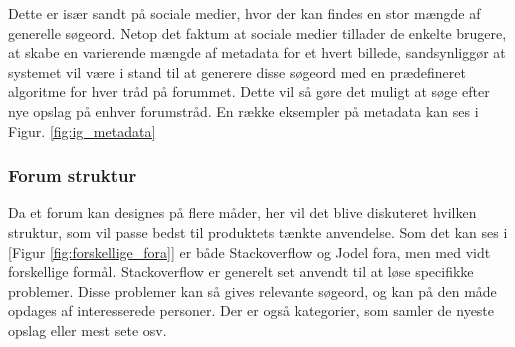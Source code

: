 Dette er især sandt på sociale medier, hvor der kan findes en stor mængde af generelle søgeord. Netop det faktum at sociale medier tillader de enkelte brugere, at skabe en varierende mængde af metadata for et hvert billede, sandsynliggør at systemet vil være i stand til at generere disse søgeord med en prædefineret algoritme for hver tråd på forummet. Dette vil så gøre det muligt at søge efter nye opslag på enhver forumstråd. En række eksempler på metadata kan ses i Figur. \ref{fig:ig_metadata}

\subsubsection{Forum struktur}
\label{forum_struktur}
Da et forum kan designes på flere måder, her vil det blive diskuteret hvilken struktur, som vil passe bedst til produktets tænkte anvendelse. Som det kan ses i [Figur \ref{fig:forskellige_fora}] er både Stackoverflow og Jodel fora, men med vidt forskellige formål. Stackoverflow er generelt set anvendt til at løse specifikke problemer. Disse problemer kan så gives relevante søgeord, og kan på den måde opdages af interesserede personer. Der er også kategorier, som samler de nyeste opslag eller mest sete osv.

